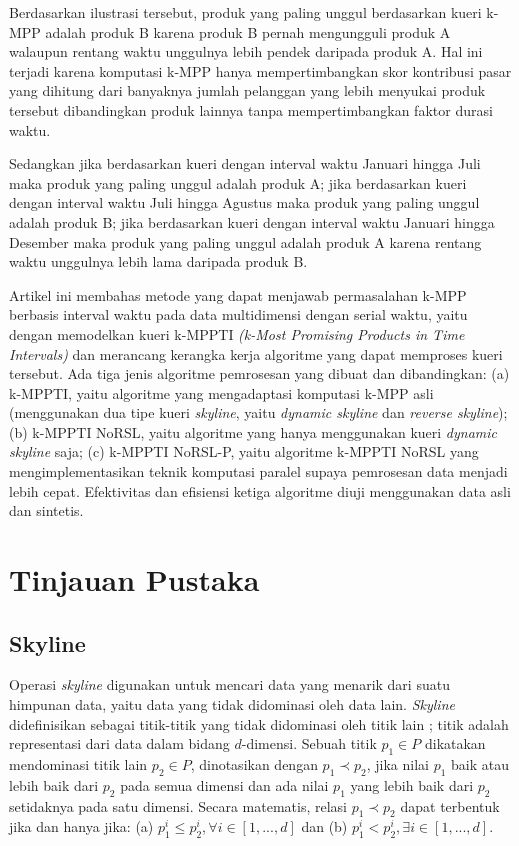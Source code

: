 \documentclass[conference]{IEEEtran}
\begin{document}
Berdasarkan ilustrasi tersebut, produk yang paling unggul berdasarkan kueri k-MPP adalah produk B karena produk B pernah mengungguli produk A walaupun rentang waktu unggulnya lebih pendek daripada produk A. Hal ini terjadi karena komputasi k-MPP hanya mempertimbangkan skor kontribusi pasar yang dihitung dari banyaknya jumlah pelanggan yang lebih menyukai produk tersebut dibandingkan produk lainnya tanpa mempertimbangkan faktor durasi waktu.

Sedangkan jika berdasarkan kueri dengan interval waktu Januari hingga Juli maka produk yang paling unggul adalah produk A; jika berdasarkan kueri dengan interval waktu Juli hingga Agustus maka produk yang paling unggul adalah produk B; jika berdasarkan kueri dengan interval waktu Januari hingga Desember maka produk yang paling unggul adalah produk A karena rentang waktu unggulnya lebih lama daripada produk B.

Artikel ini membahas metode yang dapat menjawab permasalahan k-MPP berbasis interval waktu pada data multidimensi dengan serial waktu, yaitu dengan memodelkan kueri k-MPPTI \textit{(k-Most Promising Products in Time Intervals)} dan merancang kerangka kerja algoritme yang dapat memproses kueri tersebut. Ada tiga jenis algoritme pemrosesan yang dibuat dan dibandingkan: (a) k-MPPTI, yaitu algoritme yang mengadaptasi komputasi k-MPP asli (menggunakan dua tipe kueri \textit{skyline}, yaitu \textit{dynamic skyline} dan \textit{reverse skyline}); (b) k-MPPTI NoRSL, yaitu algoritme yang hanya menggunakan kueri \textit{dynamic skyline} saja; (c) k-MPPTI NoRSL-P, yaitu algoritme k-MPPTI NoRSL yang mengimplementasikan teknik komputasi paralel supaya pemrosesan data menjadi lebih cepat. Efektivitas dan efisiensi ketiga algoritme diuji menggunakan data asli dan sintetis.

\section{Tinjauan Pustaka}

\subsection{Skyline}
Operasi \textit{skyline} digunakan untuk mencari data yang menarik dari suatu himpunan data, yaitu data yang tidak didominasi oleh data lain. \textit{Skyline} didefinisikan sebagai titik-titik yang tidak didominasi oleh titik lain \cite{skyline}; titik adalah representasi dari data dalam bidang $d$-dimensi. Sebuah titik $p_1 \in P$ dikatakan mendominasi titik lain $p_2 \in P$, dinotasikan dengan  $p_1 \prec p_2$, jika nilai $p_1$ baik atau lebih baik dari $p_2$ pada semua dimensi dan ada nilai $p_1$ yang lebih baik dari $p_2$ setidaknya pada satu dimensi. Secara matematis, relasi $p_1 \prec p_2$ dapat terbentuk jika dan hanya jika: (a) $p_1^i \leq p_2^i, \forall i \in [1, ..., d]$ dan (b) $p_1^i < p_2^i, \exists i \in [1, ..., d]$. 
\end{document}
